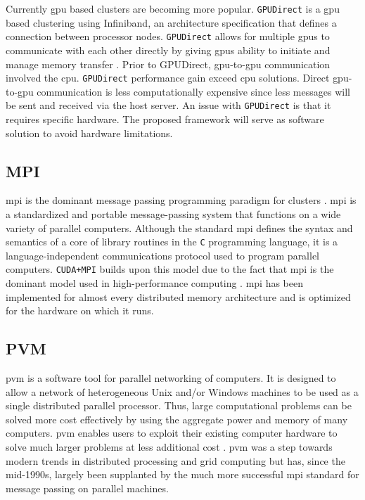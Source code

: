 Currently \gls{gpu} based clusters are becoming more popular.
\texttt{GPUDirect} is a \gls{gpu} based clustering using Infiniband, an
architecture specification that defines a connection between processor nodes.
\texttt{GPUDirect} allows for multiple \glspl{gpu} to communicate with each
other directly by giving \glspl{gpu} ability to initiate and manage memory
transfer \cite{website:YouTube}. Prior to GPUDirect, \gls{gpu}-to-\gls{gpu}
communication involved the \gls{cpu}. \texttt{GPUDirect} performance gain
exceed \gls{cpu} solutions. Direct \gls{gpu}-to-\gls{gpu} communication is less
computationally expensive since less messages will be sent and received via the
host server. An issue with \texttt{GPUDirect} is that it requires specific
hardware. The proposed framework will serve as software solution to avoid
hardware limitations.


\subsection{MPI}

\Gls{mpi} is the dominant message passing programming paradigm for clusters
\cite{website:Message-Passing-Interface-Forum}
\cite{website:Message-Passing-Interface}. \gls{mpi} is a standardized and
portable message-passing system that functions on a wide variety of parallel
computers. Although the standard \gls{mpi} defines the syntax and semantics of
a core of library routines in the \texttt{C} programming language, it is a
language-independent communications protocol used to program parallel
computers. \texttt{CUDA+MPI} builds upon this model due to the fact that
\gls{mpi} is the dominant model used in high-performance computing
\cite{sur2006high}. \Gls{mpi} has been implemented for almost every distributed
memory architecture and is optimized for the hardware on which it runs.

\subsection{PVM}

\Gls{pvm} is a software tool for parallel networking of computers. It is
designed to allow a network of heterogeneous Unix and/or Windows machines to be
used as a single distributed parallel processor. Thus, large computational
problems can be solved more cost effectively by using the aggregate power and
memory of many computers. \gls{pvm} enables users to exploit their existing
computer hardware to solve much larger problems at less additional cost
\cite{website:Computer-Science-and-Division}. \gls{pvm} was a step towards
modern trends in distributed processing and grid computing but has, since the
mid-1990s, largely been supplanted by the much more successful \gls{mpi}
standard for message passing on parallel machines.

